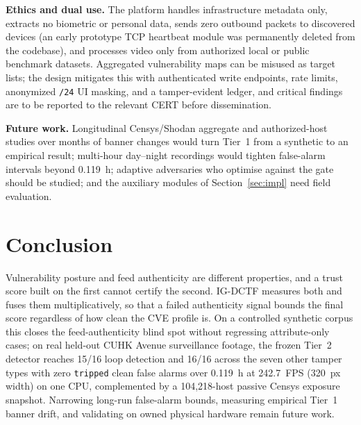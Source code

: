 \documentclass[journal]{IEEEtran}
\begin{document}
\textbf{Ethics and dual use.} The platform handles infrastructure metadata only, extracts no biometric or personal data, sends zero outbound packets to discovered devices (an early prototype TCP heartbeat module was permanently deleted from the codebase), and processes video only from authorized local or public benchmark datasets. Aggregated vulnerability maps can be misused as target lists; the design mitigates this with authenticated write endpoints, rate limits, anonymized \texttt{/24} UI masking, and a tamper-evident ledger, and critical findings are to be reported to the relevant CERT before dissemination.

\textbf{Future work.} Longitudinal Censys/Shodan aggregate and authorized-host studies over months of banner changes would turn Tier~1 from a synthetic to an empirical result; multi-hour day--night recordings would tighten false-alarm intervals beyond 0.119~h; adaptive adversaries who optimise against the gate should be studied; and the auxiliary modules of Section~\ref{sec:impl} need field evaluation.

\section{Conclusion}
Vulnerability posture and feed authenticity are different properties, and a trust score built on the first cannot certify the second. IG-DCTF measures both and fuses them multiplicatively, so that a failed authenticity signal bounds the final score regardless of how clean the CVE profile is. On a controlled synthetic corpus this closes the feed-authenticity blind spot without regressing attribute-only cases; on real held-out CUHK Avenue surveillance footage, the frozen Tier~2 detector reaches 15/16 loop detection and 16/16 across the seven other tamper types with zero \texttt{tripped} clean false alarms over 0.119~h at 242.7~FPS (320~px width) on one CPU, complemented by a 104,218-host passive Censys exposure snapshot. Narrowing long-run false-alarm bounds, measuring empirical Tier~1 banner drift, and validating on owned physical hardware remain future work.



\end{document}
